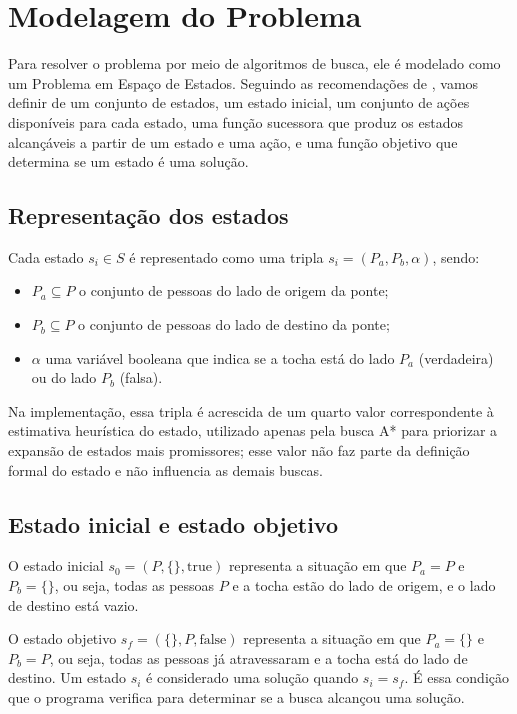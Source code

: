 \section{Modelagem do Problema}
\label{sec:modelagem}

Para resolver o problema por meio de algoritmos de busca, ele é modelado como
um Problema em Espaço de Estados.
Seguindo as recomendações de \cite{poole2010}, vamos definir
de um conjunto de estados, um estado inicial, um conjunto de ações disponíveis
para cada estado, uma função sucessora que produz os estados alcançáveis a
partir de um estado e uma ação, e uma função objetivo que determina se um
estado é uma solução.

\subsection{Representação dos estados}

Cada estado $s_i \in S$ é representado como uma tripla $s_i = (P_a, P_b, \alpha)$,
sendo:
\begin{itemize}
	\item $P_a \subseteq P$ o conjunto de pessoas do lado de origem da ponte;
	\item $P_b \subseteq P$ o conjunto de pessoas do lado de destino da ponte;
	\item $\alpha$ uma variável booleana que indica se a tocha está do lado
	      $P_a$ (verdadeira) ou do lado $P_b$ (falsa).
\end{itemize}

Na implementação, essa tripla é acrescida de um quarto valor correspondente à
estimativa heurística do estado, utilizado apenas pela busca A* para
priorizar a expansão de estados mais promissores; esse valor não faz parte da
definição formal do estado e não influencia as demais buscas.

\subsection{Estado inicial e estado objetivo}

O estado inicial $s_0 = (P, \{\}, \text{true})$ representa a situação em que
$P_a = P$ e $P_b = \{\}$, ou seja, todas as pessoas $P$ e a tocha estão do
lado de origem, e o lado de destino está vazio.

O estado objetivo $s_f = (\{\}, P, \text{false})$ representa a situação em
que $P_a = \{\}$ e $P_b = P$, ou seja, todas as pessoas já atravessaram e a
tocha está do lado de destino. Um estado $s_i$ é considerado uma solução
quando $s_i = s_f$. É essa condição que o programa verifica para determinar
se a busca alcançou uma solução.


